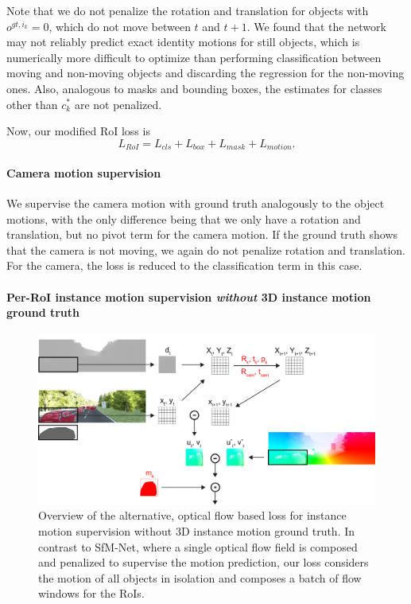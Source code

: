 Note that we do not penalize the rotation and translation for objects with
$o^{gt,i_k} = 0$, which do not move between $t$ and $t+1$. We found that the network
may not reliably predict exact identity motions for still objects, which is
numerically more difficult to optimize than performing classification between
moving and non-moving objects and discarding the regression for the non-moving
ones. Also, analogous to masks and bounding boxes, the estimates for classes
other than $c_k^*$ are not penalized.

Now, our modified RoI loss is
\begin{equation}
L_{RoI} = L_{cls} + L_{box} + L_{mask} + L_{motion}.
\end{equation}

\paragraph{Camera motion supervision}
We supervise the camera motion with ground truth analogously to the
object motions, with the only difference being that we only have
a rotation and translation, but no pivot term for the camera motion.
If the ground truth shows that the camera is not moving, we again do not
penalize rotation and translation. For the camera, the loss is reduced to the
classification term in this case.

\paragraph{Per-RoI instance motion supervision \emph{without} 3D instance motion ground truth}
\begin{figure}[t]
  \centering
  \includegraphics[width=\textwidth]{figures/flow_loss}
\caption{
Overview of the alternative, optical flow based loss for instance motion
supervision without 3D instance motion ground truth.
In contrast to SfM-Net, where a single optical flow field is
composed and penalized to supervise the motion prediction, our loss considers
the motion of all objects in isolation and composes a batch of flow windows
for the RoIs.
}
\label{figure:flow_loss}
\end{figure}

